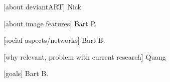 [about deviantART] Nick

[about image features] Bart P.

[social aspects/networks] Bart B.

[why relevant, problem with current research] Quang

[goals] Bart B.